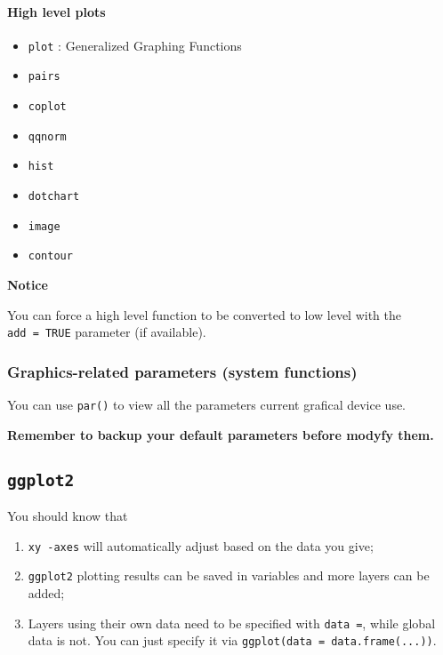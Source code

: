 \documentclass[
]{article}
\begin{document}
\hypertarget{high-level-plots}{%
\paragraph{High level plots}\label{high-level-plots}}

\begin{itemize}
\item
  \texttt{plot} : Generalized Graphing Functions
\item
  \texttt{pairs}
\item
  \texttt{coplot}
\item
  \texttt{qqnorm}
\item
  \texttt{hist}
\item
  \texttt{dotchart}
\item
  \texttt{image}
\item
  \texttt{contour}
\end{itemize}

\textbf{Notice}

You can force a high level function to be converted to low level with
the \texttt{add\ =\ TRUE} parameter (if available).

\hypertarget{graphics-related-parameters-system-functions}{%
\subsubsection{Graphics-related parameters (system
functions)}\label{graphics-related-parameters-system-functions}}

You can use \texttt{par()} to view all the parameters current grafical
device use.

\textbf{Remember to backup your default parameters before modyfy them.}

\hypertarget{ggplot2}{%
\subsection{\texorpdfstring{\texttt{ggplot2}}{ggplot2}}\label{ggplot2}}

You should know that

\begin{enumerate}
\def\labelenumi{\arabic{enumi}.}
\item
  \texttt{xy\ -axes} will automatically adjust based on the data you
  give;
\item
  \texttt{ggplot2} plotting results can be saved in variables and more
  layers can be added;
\item
  Layers using their own data need to be specified with
  \texttt{data\ =}, while global data is not. You can just specify it
  via \texttt{ggplot(data\ =\ data.frame(...))}.
\end{enumerate}
\end{document}
